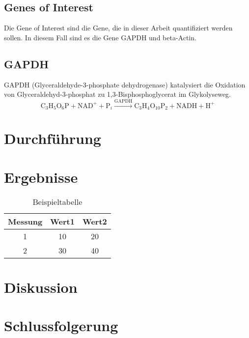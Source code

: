 \documentclass{article}
\begin{document}
\subsection*{Genes of Interest}
Die Gene of Interest sind die Gene, die in dieser Arbeit quantifiziert
werden sollen. In diesem Fall sind es die Gene GAPDH und beta-Actin.

\subsection*{GAPDH}

GAPDH (Glyceraldehyde-3-phosphate dehydrogenase) katalysiert die
Oxidation von Glyceraldehyd-3-phosphat zu 1,3-Bisphosphoglycerat im
Glykolyseweg.
\[
\text{C}_3\text{H}_5\text{O}_6\text{P} + \text{NAD}^+ + \text{P}_i \xrightarrow{\text{GAPDH}} \text{C}_3\text{H}_4\text{O}_{10}\text{P}_2 + \text{NADH} + \text{H}^+
\]

\section{Durchführung}

\section{Ergebnisse}

\begin{table}[H]
    \centering
    \begin{tabular}{|c|c|c|}
    \hline
    Messung & Wert1 & Wert2 \\
    \hline
    1 & 10 & 20 \\
    2 & 30 & 40 \\
    \hline
    \end{tabular}
    \caption{Beispieltabelle}
    \label{tab:beispiel}
\end{table}


\section{Diskussion}

\section{Schlussfolgerung}



\end{document}
